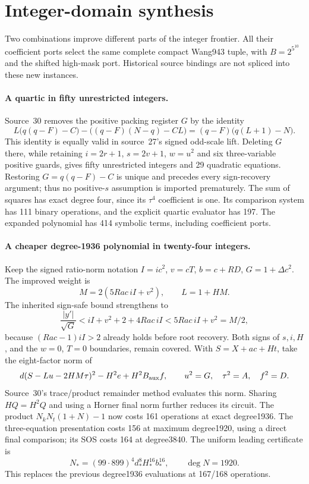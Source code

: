 \section{Integer-domain synthesis}
Two combinations improve different parts of the integer frontier. All their
coefficient ports select the same complete compact Wang943 tuple, with
$B=2^{5^{10}}$ and the shifted high-mask port. Historical source bindings are
not spliced into these new instances.

\paragraph{A quartic in fifty unrestricted integers.}
Source~30 removes the positive packing register $G$ by the identity
\[
 L\bigl(q(q-F)-C\bigr)-\bigl((q-F)(N-q)-CL\bigr)
   =(q-F)\bigl(q(L+1)-N\bigr).
\]
This identity is equally valid in source~27's signed odd-scale lift. Deleting
$G$ there, while retaining $i=2r+1$, $s=2v+1$, $w=u^2$ and six three-variable
positive guards, gives fifty unrestricted integers and 29 quadratic equations.
Restoring $G=q(q-F)-C$ is unique and precedes every sign-recovery argument;
thus no positive-$s$ assumption is imported prematurely. The sum of squares
has exact degree four, since its $\tau^4$ coefficient is one. Its comparison
system has 111 binary operations, and the explicit quartic evaluator has 197.
The expanded polynomial has 414 symbolic terms, including coefficient ports.

\paragraph{A cheaper degree-1936 polynomial in twenty-four integers.}
Keep the signed ratio-norm notation $I=ic^2$, $v=cT$, $b=c+RD$,
$G=1+\Delta c^2$. The improved weight is
\[
 M=2(5Rac\,iI+v^2),\qquad L=1+HM.
\]
The inherited sign-safe bound strengthens to
\[
 \frac{|y'|}{\sqrt G}
 <iI+v^2+2+4Rac\,iI
 <5Rac\,iI+v^2=M/2,
\]
because $(Rac-1)iI>2$ already holds before root recovery. Both signs of
$s,i,H$, and the $w=0$, $T=0$ boundaries, remain covered. With
$S=X+ac+Ht$, take the eight-factor norm of
\[
 d(S-Lu-2HM\tau)^2-H^2e+H^2B_{\rm aux}f,
 \qquad u^2=G,\quad\tau^2=A,\quad f^2=D.
\]
Source~30's trace/product remainder method evaluates this norm. Sharing
$HQ=H^2Q$ and using a Horner final norm further reduces its circuit.
The product $N_kN_t(1+N)-1$ now costs 161 operations at exact degree1936.
The three-equation presentation costs 156 at maximum degree1920, using a
direct final comparison; its SOS costs 164 at degree3840.
The uniform leading certificate is
\[
 N_*=(99\cdot899)^4d_*^8H_*^{16}b_*^{16},
 \qquad \deg N=1920.
\]
This replaces the previous degree1936 evaluations at 167/168 operations.

